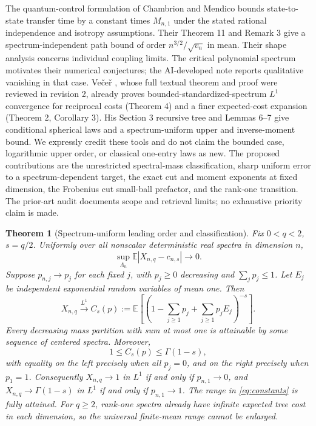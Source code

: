 \documentclass[11pt]{article}
\newtheorem{theorem}{Theorem}
\newcommand{\E}{\mathbb E}
\begin{document}
The quantum-control formulation of Chambrion and Mendico \cite{CMcontrol,CMnumerical} bounds state-to-state transfer time by a constant times $M_{n,1}$ under the stated rational independence and isotropy assumptions. Their Theorem 11 and Remark 3 give a spectrum-independent path bound of order $n^{3/2}/\sqrt{v_n}$ in mean. Their shape analysis concerns individual coupling limits. The critical polynomial spectrum motivates their numerical conjectures; the AI-developed note \cite{IRSI} reports qualitative vanishing in that case. Ve\v{c}e\v{r} \cite{Vecer}, whose full textual theorem and proof were reviewed in revision 2, already proves bounded-standardized-spectrum $L^1$ convergence for reciprocal costs (Theorem 4) and a finer expected-cost expansion (Theorem 2, Corollary 3). His Section 3 recursive tree and Lemmas 6--7 give conditional spherical laws and a spectrum-uniform upper and inverse-moment bound. We expressly credit these tools and do not claim the bounded case, logarithmic upper order, or classical one-entry laws as new. The proposed contributions are the unrestricted spectral-mass classification, sharp uniform error to a spectrum-dependent target, the exact cut and moment exponents at fixed dimension, the Frobenius cut small-ball prefactor, and the rank-one transition. The prior-art audit documents scope and retrieval limits; no exhaustive priority claim is made.

\begin{theorem}[Spectrum-uniform leading order and classification]\label{thm:main}
Fix $0<q<2$, $s=q/2$. Uniformly over all nonscalar deterministic real spectra in dimension $n$,
\begin{equation}
\sup_{\Lambda_n}\E|X_{n,q}-c_{n,s}|\longrightarrow0.
\label{eq:uniform}
\end{equation}
Suppose $p_{n,j}\to p_j$ for each fixed $j$, with $p_j\ge0$ decreasing and $\sum_jp_j\le1$. Let $E_j$ be independent exponential random variables of mean one. Then
\begin{equation}
 X_{n,q}\xrightarrow{L^1}C_s(p):=\E\left[\left(1-\sum_{j\ge1}p_j+\sum_{j\ge1}p_jE_j\right)^{-s}\right].\label{eq:classification}
\end{equation}
Every decreasing mass partition with sum at most one is attainable by some sequence of centered spectra. Moreover,
\begin{equation}
1\le C_s(p)\le\Gamma(1-s),\label{eq:constants}
\end{equation}
with equality on the left precisely when all $p_j=0$, and on the right precisely when $p_1=1$. Consequently $X_{n,q}\to1$ in $L^1$ if and only if $p_{n,1}\to0$, and $X_{n,q}\to\Gamma(1-s)$ in $L^1$ if and only if $p_{n,1}\to1$. The range in \eqref{eq:constants} is fully attained. For $q\ge2$, rank-one spectra already have infinite expected tree cost in each dimension, so the universal finite-mean range cannot be enlarged.
\end{theorem}
\end{document}
